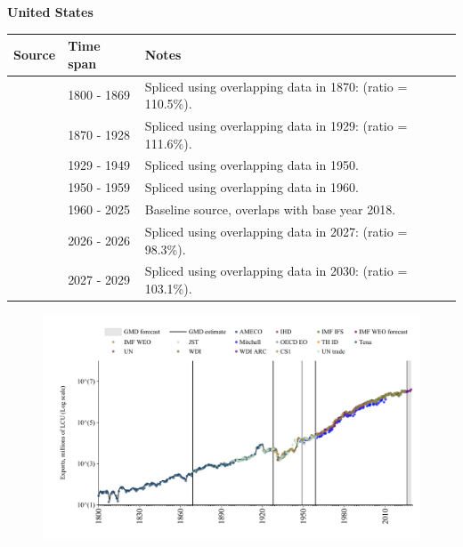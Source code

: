 \documentclass[12pt,a4paper,landscape]{article}
\begin{document}
\begin{adjustbox}{max totalsize={\paperwidth}{\paperheight},center}
\begin{minipage}[t][\textheight][t]{\textwidth}
\vspace*{0.5cm}
{}
\begin{center}
{\Large\bfseries United States}
\end{center}
\vspace{0.5cm}
\begin{table}[H]
\centering
\small
\begin{tabular}{|l|l|l|}
\hline
\textbf{Source} & \textbf{Time span} & \textbf{Notes} \\
\hline
\rowcolor{white}\cite{Tena}& 1800 - 1869 &Spliced using overlapping data in 1870: (ratio = 110.5\%).\\
\rowcolor{lightgray}\cite{JST}& 1870 - 1928 &Spliced using overlapping data in 1929: (ratio = 111.6\%).\\
\rowcolor{white}\cite{CS1_USA}& 1929 - 1949 &Spliced using overlapping data in 1950.\\
\rowcolor{lightgray}\cite{IMF_IFS}& 1950 - 1959 &Spliced using overlapping data in 1960.\\
\rowcolor{white}\cite{OECD_EO}& 1960 - 2025 &Baseline source, overlaps with base year 2018.\\
\rowcolor{lightgray}\cite{AMECO}& 2026 - 2026 &Spliced using overlapping data in 2027: (ratio = 98.3\%).\\
\rowcolor{white}\cite{IMF_WEO_forecast}& 2027 - 2029 &Spliced using overlapping data in 2030: (ratio = 103.1\%).\\
\hline
\end{tabular}
\end{table}
\begin{figure}[H]
\centering
\includegraphics[width=\textwidth,height=0.6\textheight,keepaspectratio]{graphs/USA_exports.pdf}
\end{figure}
\end{minipage}
\end{adjustbox}
\end{document}
